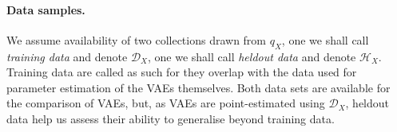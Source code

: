
\paragraph{Data samples.} We assume availability of two collections drawn from $q_X$, one we shall call \emph{training data} and denote $\mathcal D_X$, one we shall call \emph{heldout data} and denote $\mathcal H_X$. 
Training data are called as such for they overlap with the data used for parameter estimation of the VAEs themselves.
Both data sets are available for the comparison of VAEs, but, as VAEs are point-estimated using $\mathcal D_X$, heldout data help us assess their ability to generalise beyond training data.



